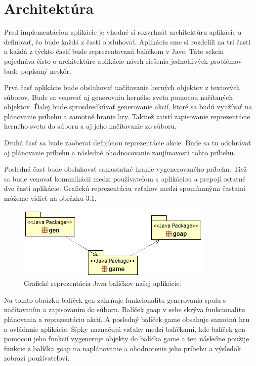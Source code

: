 \section{Architektúra}
Pred implementáciou aplikácie je vhodné si rozvrhnúť architektúru aplikácie a definovať, čo bude každá z častí obsluhovať. Aplikáciu sme si rozdelili na tri časti a každá z týchto častí bude reprezentovaná balíčkom v Jave. Táto sekcia pojednáva čisto o architektúre aplikácie návrh riešenia jednotlivých problémov bude popísaný neskôr.\par
Prvá časť aplikácie bude obsluhovať načítavanie herných objektov z textových súborov. Bude sa venovať aj generovniu herného sveta pomocou načítaných objektov. Ďalej bude sprosdredkúvať generovanie akcií, ktoré sa budú využívať na plánovanie príbehu a samotné hranie hry. Taktiež zaistí zapisovanie reprezentácie herného sveta do súboru a aj jeho načítavanie zo súboru.\par
Druhá časť sa bude zaoberať definíciou reprezentácie akcie. Bude sa tu odohrávať aj plánovanie príbehu a následné ohodnocovanie zaujímavosti tohto príbehu.\par
Posledná časť bude obsluhovať samostatné hranie vygenerovaného príbehu. Tiež sa bude venovať komunikácii medzi používateľom a aplikáciou a prepojí ostatné dve časti aplikácie. Grafickú reprezentáciu vzťahov medzi spomínanými častami môžeme vidieť na obrázku 3.1.
\begin{figure}[H] 
\begin{center}
\includegraphics[scale=1.0]{img/packages.png}
\caption{Grafické reprezentácia Java balíčkov našej aplikácie.}
\label{fig:ch31}
\end{center}
\end{figure}
Na tomto obrázku balíček gen zahrňuje funkcionalitu generovania spolu s načítavaním a zapisovaním do súboru. Balíček goap v sebe skrýva funkcionalitu plánovania a reprezentáciu akcií. A posledný balíček game obsahuje samotnú hru a ovládanie aplikácie. Šípky naznačujú vzťahy medzi balíčkami, kde balíček gen pomocou jeho funkcií vygeneruje objekty do balíčka game a ten následne použije funkcie z balíčka goap na naplánovanie a ohodnotenie jeho príbehu a výsledok zobrazí používateľovi.

